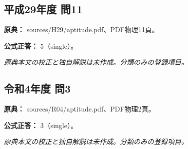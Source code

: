 \subsection{平成29年度 問11}
\label{q:h29-reg-apt-11}

\noindent\textbf{原典：} sources/H29/aptitude.pdf、PDF物理11頁。

\textbf{公式正答：} 5（single）。

\par\textit{原典本文の校正と独自解説は未作成。分類のみの登録項目。}

\subsection{令和4年度 問3}
\label{q:r04-reg-apt-03}

\noindent\textbf{原典：} sources/R04/aptitude.pdf、PDF物理2頁。

\textbf{公式正答：} 3（single）。

\par\textit{原典本文の校正と独自解説は未作成。分類のみの登録項目。}
